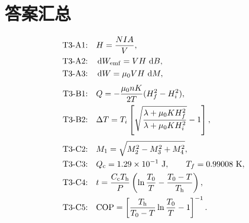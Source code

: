 \documentclass[UTF8,11pt,a4paper,fontset=fandol]{ctexart}
\newcommand{\dd}{\mathop{}\!\mathrm d}
\begin{document}
\section*{答案汇总}
\begin{answerbox}
\begin{align*}
\text{T3-A1:}\quad &H=\frac{NIA}{V},\\
\text{T3-A2:}\quad &\dd W_{\rm emf}=VH\,\dd B,\\
\text{T3-A3:}\quad &\dd W=\mu_0VH\,\dd M,\\[0.3em]
\text{T3-B1:}\quad &Q=-\frac{\mu_0nK}{2T}(H_f^2-H_i^2),\\
\text{T3-B2:}\quad &\Delta T=T_i\left[\sqrt{\frac{\lambda+\mu_0KH_f^2}{\lambda+\mu_0KH_i^2}}-1\right],\\[0.3em]
\text{T3-C2:}\quad &M_1=\sqrt{M_2^2-M_3^2+M_4^2},\\
\text{T3-C3:}\quad &Q_{\mathrm c}=1.29\times10^{-1}\ \mathrm J,\qquad T_f=0.99008\ \mathrm K,\\
\text{T3-C4:}\quad &t=\frac{C_{\mathrm c}T_{\mathrm h}}{P}
\left(\ln\frac{T_0}{T}-\frac{T_0-T}{T_{\mathrm h}}\right),\\
\text{T3-C5:}\quad &\mathrm{COP}=\left[\frac{T_{\mathrm h}}{T_0-T}\ln\frac{T_0}{T}-1\right]^{-1}.
\end{align*}
\end{answerbox}
\end{document}
